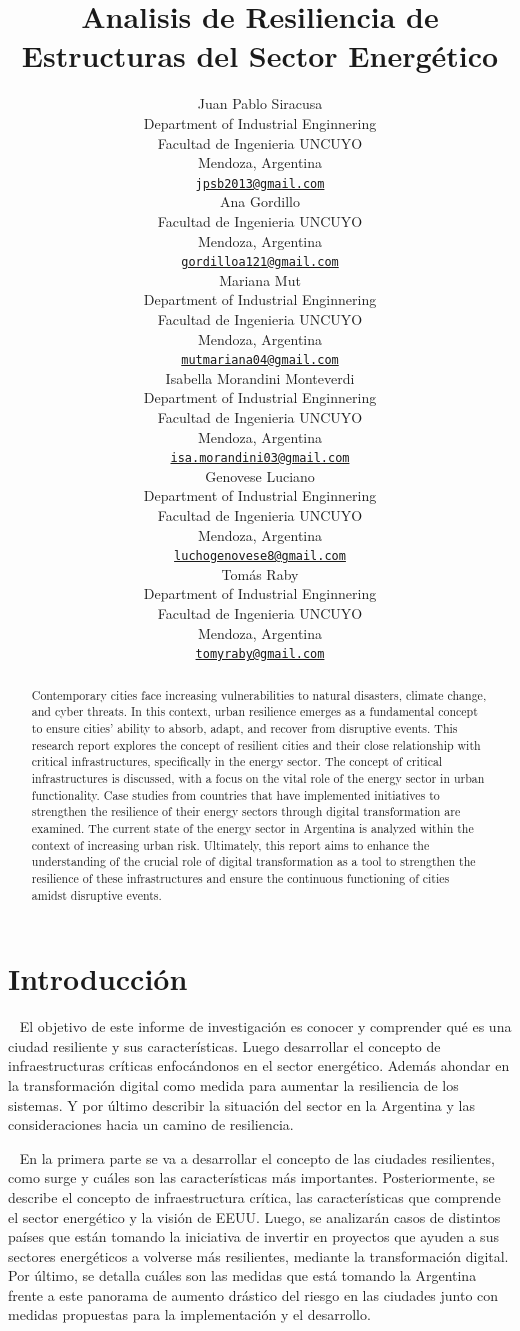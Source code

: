 \documentclass{article}
\title{Analisis de Resiliencia de Estructuras del Sector Energético}
\author{
    Juan Pablo Siracusa
   \\
    Department of Industrial Enginnering \\
    Facultad de Ingenieria UNCUYO \\
  Mendoza, Argentina \\
  \texttt{\href{mailto:jpsb2013@gmail.com}{\nolinkurl{jpsb2013@gmail.com}}} \\
   \And
    Ana Gordillo
   \\
    Facultad de Ingenieria UNCUYO \\
  Mendoza, Argentina \\
  \texttt{\href{mailto:gordilloa121@gmail.com}{\nolinkurl{gordilloa121@gmail.com}}} \\
   \And
    Mariana Mut
   \\
    Department of Industrial Enginnering \\
    Facultad de Ingenieria UNCUYO \\
  Mendoza, Argentina \\
  \texttt{\href{mailto:mutmariana04@gmail.com}{\nolinkurl{mutmariana04@gmail.com}}} \\
   \And
    Isabella Morandini Monteverdi
   \\
    Department of Industrial Enginnering \\
    Facultad de Ingenieria UNCUYO \\
  Mendoza, Argentina \\
  \texttt{\href{mailto:isa.morandini03@gmail.com}{\nolinkurl{isa.morandini03@gmail.com}}} \\
   \And
    Genovese Luciano
   \\
    Department of Industrial Enginnering \\
    Facultad de Ingenieria UNCUYO \\
  Mendoza, Argentina \\
  \texttt{\href{mailto:luchogenovese8@gmail.com}{\nolinkurl{luchogenovese8@gmail.com}}} \\
   \And
    Tomás Raby
   \\
    Department of Industrial Enginnering \\
    Facultad de Ingenieria UNCUYO \\
  Mendoza, Argentina \\
  \texttt{\href{mailto:tomyraby@gmail.com}{\nolinkurl{tomyraby@gmail.com}}} \\
  }
\begin{document}
\maketitle


\begin{abstract}
Contemporary cities face increasing vulnerabilities to natural
disasters, climate change, and cyber threats. In this context, urban
resilience emerges as a fundamental concept to ensure cities' ability to
absorb, adapt, and recover from disruptive events. This research report
explores the concept of resilient cities and their close relationship
with critical infrastructures, specifically in the energy sector. The
concept of critical infrastructures is discussed, with a focus on the
vital role of the energy sector in urban functionality. Case studies
from countries that have implemented initiatives to strengthen the
resilience of their energy sectors through digital transformation are
examined. The current state of the energy sector in Argentina is
analyzed within the context of increasing urban risk. Ultimately, this
report aims to enhance the understanding of the crucial role of digital
transformation as a tool to strengthen the resilience of these
infrastructures and ensure the continuous functioning of cities amidst
disruptive events.
\end{abstract}


\hypertarget{introducciuxf3n}{%
\section{Introducción}\label{introducciuxf3n}}

~ El objetivo de este informe de investigación es conocer y comprender
qué es una ciudad resiliente y sus características. Luego desarrollar el
concepto de infraestructuras críticas enfocándonos en el sector
energético. Además ahondar en la transformación digital como medida para
aumentar la resiliencia de los sistemas. Y por último describir la
situación del sector en la Argentina y las consideraciones hacia un
camino de resiliencia.

~ En la primera parte se va a desarrollar el concepto de las ciudades
resilientes, como surge y cuáles son las características más
importantes. Posteriormente, se describe el concepto de infraestructura
crítica, las características que comprende el sector energético y la
visión de EEUU. Luego, se analizarán casos de distintos países que están
tomando la iniciativa de invertir en proyectos que ayuden a sus sectores
energéticos a volverse más resilientes, mediante la transformación
digital. Por último, se detalla cuáles son las medidas que está tomando
la Argentina frente a este panorama de aumento drástico del riesgo en
las ciudades junto con medidas propuestas para la implementación y el
desarrollo.
\end{document}
